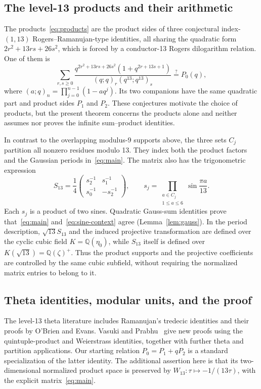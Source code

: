 \documentclass[11pt]{amsart}
\theoremstyle{remark}
\newcommand{\QQ}{\mathbb Q}
\begin{document}
\subsection{The level-13 products and their arithmetic}
The products~\eqref{eq:products} are the product sides of three
conjectural index-$(1,13)$ Rogers--Ramanujan-type identities, all sharing
the quadratic form $2r^2+13rs+26s^2$, which is forced by a conductor-13
Rogers dilogarithm relation. One of them is
\begin{equation}\label{eq:motivation-conjecture}
 \sum_{r,s\ge0}
 \frac{q^{2r^2+13rs+26s^2}(1+q^{2r+13s+1})}
 {(q;q)_r(q^{13};q^{13})_s}
 \overset{?}{=}P_0(q),
\end{equation}
where $(a;q)_n=\prod_{j=0}^{n-1}(1-aq^j)$. Its two companions have the
same quadratic part and product sides $P_1$ and $P_2$. These conjectures
motivate the choice of products, but the present theorem concerns the
products alone and neither assumes nor proves the infinite sum--product
identities.

In contrast to the overlapping modulus-9 supports above, the three sets
$C_j$ partition all nonzero residues modulo 13. They index both the product
factors and the Gaussian periods in~\eqref{eq:main}. The matrix also has the
trigonometric expression
\begin{equation}\label{eq:sine-context}
 S_{13}=\frac14
 \begin{pmatrix}s_2^{-1}&s_1^{-1}\\s_0^{-1}&-s_2^{-1}\end{pmatrix},
 \qquad
 s_j=\prod_{\substack{a\in C_j\\1\le a\le6}}\sin\frac{\pi a}{13}.
\end{equation}
Each $s_j$ is a product of two sines. Quadratic Gauss-sum identities prove
that~\eqref{eq:main} and~\eqref{eq:sine-context} agree
(Lemma~\ref{lem:gauss}). In the period description, $\sqrt{13}S_{13}$ and the
induced projective transformation are defined over the cyclic cubic field
$K=\QQ(\eta_0)$, while $S_{13}$ itself is defined over
$K(\sqrt{13})=\QQ(\zeta)^+$. Thus the product supports and the projective
coefficients are controlled by the same cubic subfield, without requiring
the normalized matrix entries to belong to it.

\subsection{Theta identities, modular units, and the proof}
The level-13 theta literature includes Ramanujan's tredecic identities and
their proofs by O'Brien and Evans. Vasuki and Prabhu~\cite{VP} give new proofs
using the quintuple-product and Weierstrass identities, together with further
theta and partition applications. Our starting relation $P_0=P_1+qP_2$ is a
standard specialization of the latter identity. The additional assertion
here is that its two-dimensional normalized product space is preserved by
$W_{13}:\tau\mapsto-1/(13\tau)$, with the explicit matrix~\eqref{eq:main}.
\end{document}
